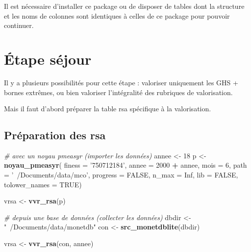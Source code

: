 \documentclass[]{book}
\newenvironment{Shaded}{\begin{snugshade}}{\end{snugshade}}
\newcommand{\KeywordTok}[1]{\textcolor[rgb]{0.13,0.29,0.53}{\textbf{#1}}}
\newcommand{\DataTypeTok}[1]{\textcolor[rgb]{0.13,0.29,0.53}{#1}}
\newcommand{\DecValTok}[1]{\textcolor[rgb]{0.00,0.00,0.81}{#1}}
\newcommand{\StringTok}[1]{\textcolor[rgb]{0.31,0.60,0.02}{#1}}
\newcommand{\CommentTok}[1]{\textcolor[rgb]{0.56,0.35,0.01}{\textit{#1}}}
\newcommand{\OtherTok}[1]{\textcolor[rgb]{0.56,0.35,0.01}{#1}}
\newcommand{\OperatorTok}[1]{\textcolor[rgb]{0.81,0.36,0.00}{\textbf{#1}}}
\newcommand{\NormalTok}[1]{#1}
\begin{document}
Il est nécessaire d'installer ce package ou de disposer de tables dont
la structure et les noms de colonnes sont identiques à celles de ce
package pour pouvoir continuer.

\begin{Shaded}
\end{Shaded}

\section{Étape séjour}\label{etape-sejour}

Il y a plusieurs possibilités pour cette étape : valoriser uniquement
les GHS + bornes extrêmes, ou bien valoriser l'intégralité des rubriques
de valorisation.

Mais il faut d'abord préparer la table rsa spécifique à la valorisation.

\subsection{Préparation des rsa}\label{preparation-des-rsa}

\begin{Shaded}
\begin{Highlighting}[]
\CommentTok{# avec un noyau pmeasyr (importer les données)}
\NormalTok{annee <-}\StringTok{ }\DecValTok{18}
\NormalTok{p <-}\StringTok{ }\KeywordTok{noyau_pmeasyr}\NormalTok{(}
  \DataTypeTok{finess   =} \StringTok{'750712184'}\NormalTok{,}
  \DataTypeTok{annee    =} \DecValTok{2000} \OperatorTok{+}\StringTok{ }\NormalTok{annee,}
  \DataTypeTok{mois     =} \DecValTok{6}\NormalTok{,}
  \DataTypeTok{path     =} \StringTok{'~/Documents/data/mco'}\NormalTok{,}
  \DataTypeTok{progress =} \OtherTok{FALSE}\NormalTok{,}
  \DataTypeTok{n_max    =} \OtherTok{Inf}\NormalTok{,}
  \DataTypeTok{lib      =} \OtherTok{FALSE}\NormalTok{,}
  \DataTypeTok{tolower_names =} \OtherTok{TRUE}\NormalTok{)}

\NormalTok{vrsa <-}\StringTok{ }\KeywordTok{vvr_rsa}\NormalTok{(p)}

\CommentTok{# depuis une base de données (collecter les données)}
\NormalTok{dbdir <-}\StringTok{ "~/Documents/data/monetdb"}
\NormalTok{con <-}\StringTok{ }\KeywordTok{src_monetdblite}\NormalTok{(dbdir)}

\NormalTok{vrsa <-}\StringTok{ }\KeywordTok{vvr_rsa}\NormalTok{(con, annee)}
\end{Highlighting}
\end{Shaded}
\end{document}
